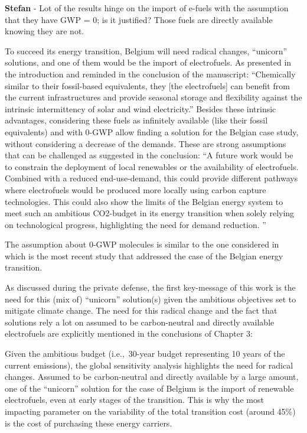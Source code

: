 \documentclass[12pt,a4paper]{article}
\def\ie{i.e.,\ }
\begin{document}
\begin{mdframed}[style=comment] %
{\color{teal} \textbf{Stefan}} - Lot of the results hinge on the import of e-fuels with the assumption that they have GWP = 0; is it justified? Those fuels are directly available knowing they are not.
\end{mdframed}

\noindent To succeed its energy transition, Belgium will need radical changes, ``unicorn'' solutions, and one of them would be the import of electrofuels. As presented in the introduction and reminded in the conclusion of the manuscript: ``Chemically similar to their fossil-based equivalents, they [the electrofuels] can benefit from the current infrastructures and provide seasonal storage and flexibility against the intrinsic intermittency of solar and wind electricity.'' Besides these intrinsic advantages, considering these fuels as infinitely available (like their fossil equivalents) and with 0-GWP allow finding a solution for the Belgian case study, without considering a decrease of the demands.  These are strong assumptions that can be challenged as suggested in the conclusion: ``A future work would be to constrain the deployment of local renewables or the availability of electrofuels. Combined with a reduced end-use-demand, this could provide different pathways where electrofuels would be produced more locally using carbon capture technologies. This could also show the limits of the Belgian energy system to meet such an ambitious CO2-budget in its energy transition when solely relying on technological progress, highlighting the need for demand reduction. ''

The assumption about 0-GWP molecules is similar to the one considered in \cite{PATHS2050} which is the most recent study that addressed the case of the Belgian energy transition. 

As discussed during the private defense, the first key-message of this work is the need for this (mix of) ``unicorn'' solution(s) given the ambitious objectives set to mitigate climate change.  The need for this radical change and the fact that solutions rely a lot on assumed to be carbon-neutral and directly available electrofuels are explicitly mentioned {\color{blue}in the conclusions of Chapter 3}: 

\begin{mdframed}[style=manuscript] %
Given the ambitious  budget (\ie 30-year budget representing 10 years of the current emissions), the global sensitivity analysis highlights the need for radical changes. Assumed to be carbon-neutral and directly available by a large amount, one of the ``unicorn'' solution for the case of Belgium is the import of renewable electrofuels, even at early stages of the transition. This is why the most impacting parameter on the variability of the total transition cost (around 45\%) is the cost of purchasing these energy carriers.
\end{mdframed}
\end{document}
